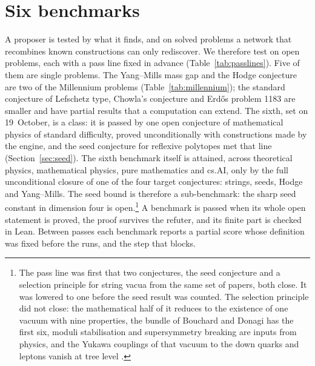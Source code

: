 \section{Six benchmarks}\label{sec:benchmark}

A proposer is tested by what it finds, and on solved problems a network that recombines known constructions can only rediscover. We therefore test on open problems, each with a pass line fixed in advance (Table~\ref{tab:passlines}). Five of them are single problems. The Yang--Mills mass gap and the Hodge conjecture are two of the Millennium problems (Table~\ref{tab:millennium}); the standard conjecture of Lefschetz type, Chowla's conjecture and Erd\H{o}s problem 1183 are smaller and have partial results that a computation can extend. The sixth, set on 19~October, is a class: it is passed by one open conjecture of mathematical physics of standard difficulty, proved unconditionally with constructions made by the engine, and the seed conjecture for reflexive polytopes met that line (Section~\ref{sec:seed}). The sixth benchmark itself is attained, across theoretical physics, mathematical physics, pure mathematics and cs.AI, only by the full unconditional closure of one of the four target conjectures: strings, seeds, Hodge and Yang--Mills. The seed bound is therefore a sub-benchmark: the sharp seed constant in dimension four is open.\footnote{The pass line was first that two conjectures, the seed conjecture and a selection principle for string vacua from the same set of papers, both close. It was lowered to one before the seed result was counted. The selection principle did not close: the mathematical half of it reduces to the existence of one vacuum with nine properties, the bundle of Bouchard and Donagi \cite{BD06} has the first six, moduli stabilisation and supersymmetry breaking are inputs from physics, and the Yukawa couplings of that vacuum to the down quarks and leptons vanish at tree level \cite{BCD06}.} A benchmark is passed when its whole open statement is proved, the proof survives the refuter, and its finite part is checked in Lean. Between passes each benchmark reports a partial score whose definition was fixed before the runs, and the step that blocks.

